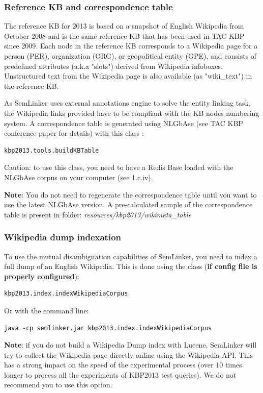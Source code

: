 \documentclass[11pt]{article}
\newcommand{\seml}{SemLinker}
\begin{document}
\subsubsection{Reference KB and correspondence table}
\label{sssec:refkb}
The reference KB for 2013 is based on a snapshot of English Wikipedia from October 2008 and is the same reference KB that has been used in TAC KBP since 2009. 
Each node in the reference KB corresponds to a Wikipedia page for a person (PER), organization (ORG), or geopolitical entity (GPE), 
and consists of predefined attributes (a.k.a "slots") derived from Wikipedia infoboxes. 
Unstructured text from the Wikipedia page is also available (as "wiki\_text") in the reference KB. 

As \seml{} uses external annotations engine to solve the entity linking task, the Wikipedia links provided have to be compliant with the KB nodes numbering system. 
A correspondence table is generated using NLGbAse (see TAC KBP conference paper for details) with this class :
\begin{lstlisting}
kbp2013.tools.buildKBTable
\end{lstlisting}

Caution: to use this class, you need to have a Redis Base loaded with the NLGbAse corpus on your computer (see 1.c.iv).

\textbf{Note}: You do not need to regenerate the correspondence table until you want to use the latest NLGbAse version. 
A pre-calculated sample of the correspondence table is present in folder: \textit{resources/kbp2013/wikimeta\_table}


\subsubsection{Wikipedia dump indexation}
\label{sssec:wikipdumpindx}
To use the mutual disambiguation capabilities of \seml{}, you need to index a full dump of an English Wikipedia. 
This is done using the class (\textbf{if config file is properly configured}):
\begin{lstlisting}
kbp2013.index.indexWikipediaCorpus
\end{lstlisting}
Or with the command line:
\begin{lstlisting}
java -cp semlinker.jar kbp2013.index.indexWikipediaCorpus
\end{lstlisting}

\textbf{Note}: if you do not build a Wikipedia Dump index with Lucene, \seml{} will try to collect the Wikipedia page directly online using the Wikipedia API. 
This has a strong impact on the speed of the experimental process (over 10 times longer to process all the experiments of KBP2013 test queries). 
We do not recommend you to use this option.
\end{document}
